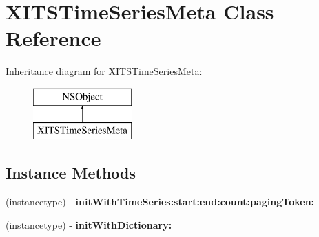 \hypertarget{interface_x_i_t_s_time_series_meta}{}\section{X\+I\+T\+S\+Time\+Series\+Meta Class Reference}
\label{interface_x_i_t_s_time_series_meta}
Inheritance diagram for X\+I\+T\+S\+Time\+Series\+Meta\+:\begin{figure}[H]
\begin{center}
\leavevmode
\includegraphics[height=2.000000cm]{interface_x_i_t_s_time_series_meta}
\end{center}
\end{figure}
\subsection*{Instance Methods}
\begin{DoxyCompactItemize}
\item 
\hypertarget{interface_x_i_t_s_time_series_meta_a4c41b1534f1602005b74eff67c408430}{}\label{interface_x_i_t_s_time_series_meta_a4c41b1534f1602005b74eff67c408430} 
(instancetype) -\/ {\bfseries init\+With\+Time\+Series\+:start\+:end\+:count\+:paging\+Token\+:}
\item 
\hypertarget{interface_x_i_t_s_time_series_meta_a90e54435d357b41e4cf64222b5a6cc9e}{}\label{interface_x_i_t_s_time_series_meta_a90e54435d357b41e4cf64222b5a6cc9e} 
(instancetype) -\/ {\bfseries init\+With\+Dictionary\+:}
\end{DoxyCompactItemize}
